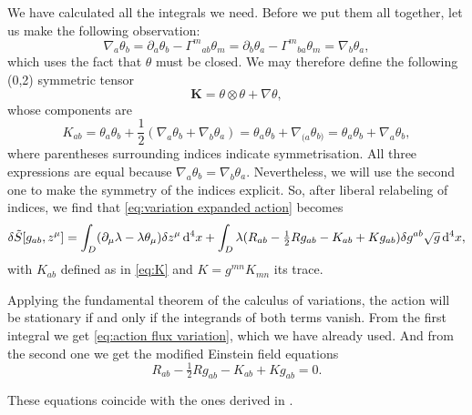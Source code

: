 \documentclass[../main.tex]{subfiles}
\begin{document}
We have calculated all the integrals we need. Before we put them all together, let us make
the following observation:
\begin{equation*}
	\nabla_a \theta_b = \partial_a \theta_b - {\Gamma^m}_{ab} \theta_m = \partial_b \theta_a
	- {\Gamma^m}_{ba} \theta_m = \nabla_b \theta_a,
\end{equation*}
which uses the fact that \( \theta \) must be closed. We may therefore define the following (0,2) symmetric tensor
\begin{equation} \label{eq:K}
\mathbf{K} = \theta \otimes \theta + \nabla \theta,
\end{equation}
whose components are
\begin{equation}
	K_{ab} = \theta_a\theta_b + \frac12\left(\nabla_{a}\theta_{b}+\nabla_{b}\theta_{a}\right) = \theta_a\theta_b + \nabla_{(a}\theta_{b)}=\theta_a\theta_b + \nabla_{a}\theta_{b},
\end{equation}
where parentheses surrounding indices indicate symmetrisation. 
All three expressions are equal because $\nabla_a \theta_b= \nabla_b \theta_a$. Nevertheless, we will use the second one to make the symmetry of the indices explicit. So, after liberal relabeling of indices, we find that \cref{eq:variation expanded action}
becomes
\begin{equation} \label{eq:final variation of action}
	\delta\tilde{S}[g_{ab}, z^\mu] = \int_D(\partial_\mu \lambda - \lambda \theta_\mu)
	\delta z^\mu \,\mathrm{d}^4 x + \int_D \lambda (R_{ab} - \tfrac{1}{2} Rg_{ab} - K_{ab} +
	Kg_{ab})\delta g^{ab} \sqrt{g} \,\mathrm{d}^4 x,
\end{equation}
with \( K_{ab} \) defined as in \cref{eq:K} and \( K = g^{mn}K_{mn} \) its trace. 

Applying the fundamental theorem of the calculus of variations, the action will be
stationary if and only if the integrands of both terms vanish. From the first integral we
get \cref{eq:action flux variation}, which we have already used. And from the second one
we get the modified Einstein field equations
\begin{equation} \label{eq:modified EFE}
	R_{ab} - \tfrac{1}{2}Rg_{ab} - K_{ab} + Kg_{ab} = 0.
\end{equation}

These equations coincide with the ones derived in \cite{Lazo2021}.
\end{document}
